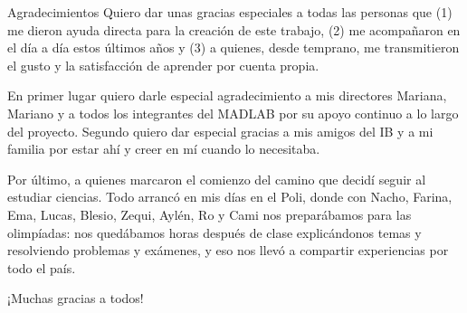 \documentclass[12pt,screen,twoside,openany]{ibtesis} %
\begin{document}
\begin{postliminary}

\begin{seccion}{Agradecimientos}
Quiero dar unas gracias especiales a todas las personas que (1) me dieron ayuda
directa para la creación de este trabajo, (2) me acompañaron en el día a día estos
últimos años y (3) a quienes, desde temprano, me transmitieron el gusto y la
satisfacción de aprender por cuenta propia.

En primer lugar quiero darle especial agradecimiento a mis directores Mariana,
Mariano y a todos los integrantes del MADLAB por su apoyo continuo a lo largo del
proyecto. Segundo quiero dar especial gracias a mis amigos
del IB y a mi familia por estar ahí y creer en mí cuando lo necesitaba.

Por último, a quienes marcaron el comienzo del camino que decidí seguir al estudiar
ciencias. Todo arrancó en mis días en el Poli, donde con Nacho, Farina, Ema, Lucas,
Blesio, Zequi, Aylén, Ro y Cami nos preparábamos para las olimpíadas: nos quedábamos
horas después de clase explicándonos temas y resolviendo problemas y exámenes, y eso
nos llevó a compartir experiencias por todo el país.

¡Muchas gracias a todos!
\end{seccion}

\end{postliminary}
\end{document}
